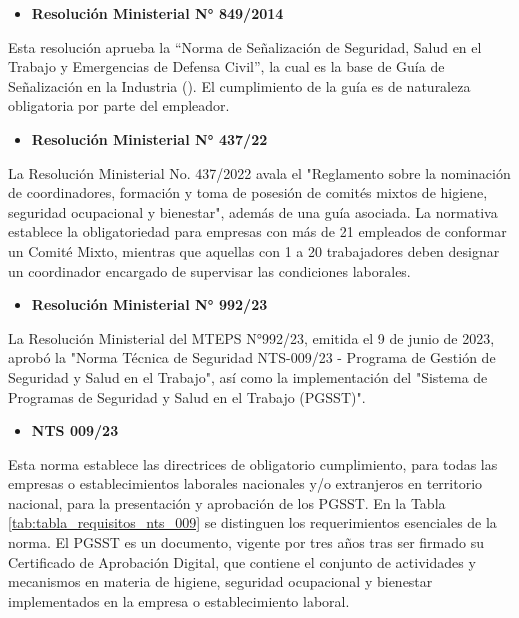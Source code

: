 \begin{samepage}
\begin{itemize} [wide=0pt, topsep=0pt] \item \textbf{Resolución Ministerial N° 849/2014} \end{itemize} 

\indent
Esta resolución aprueba la ``Norma de Señalización de Seguridad, Salud en el Trabajo y Emergencias de
Defensa Civil'', la cual es la base de Guía de Señalización en la Industria (\cite{guiaSeñalizacion}). El cumplimiento de la guía es de naturaleza obligatoria por parte del empleador.
\end{samepage}

\begin{samepage}
\begin{itemize} [wide=0pt, topsep=0pt] \item \textbf{Resolución Ministerial N° 437/22} \end{itemize} 

\indent
La Resolución Ministerial No. 437/2022 avala el "Reglamento sobre la nominación de coordinadores, formación y toma de posesión de comités mixtos de higiene, seguridad ocupacional y bienestar", además de una guía asociada. La normativa establece la obligatoriedad para empresas con más de 21 empleados de conformar un Comité Mixto, mientras que aquellas con 1 a 20 trabajadores deben designar un coordinador encargado de supervisar las condiciones laborales.
\end{samepage}

\begin{samepage}
\begin{itemize} [wide=0pt, topsep=0pt] \item \textbf{Resolución Ministerial N° 992/23} \end{itemize} 

\indent
La Resolución Ministerial del MTEPS N°992/23, emitida el 9 de junio de 2023, aprobó la "Norma Técnica de Seguridad NTS-009/23 - Programa de Gestión de Seguridad y Salud en el Trabajo", así como la implementación del "Sistema de Programas de Seguridad y Salud en el Trabajo (PGSST)". 
\end{samepage}

\begin{samepage}
\begin{itemize} [wide=0pt, topsep=0pt] \item \textbf{NTS 009/23} \end{itemize}

\indent
Esta norma establece las directrices de obligatorio cumplimiento, para todas las empresas o establecimientos
laborales nacionales y/o extranjeros en territorio nacional, para la presentación y aprobación de los PGSST. En la Tabla \ref{tab:tabla_requisitos_nts_009} se distinguen los requerimientos esenciales de la norma. 
El PGSST es un documento, vigente por tres años tras ser firmado su Certificado de Aprobación Digital,  que contiene el conjunto de actividades y mecanismos en materia de higiene, seguridad ocupacional y bienestar implementados en la empresa o establecimiento laboral.
\end{samepage}

